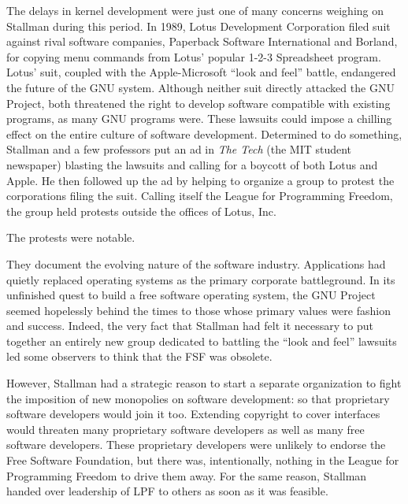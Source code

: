 The delays in kernel development were just one of many concerns weighing on Stallman during this period. In 1989, Lotus Development Corporation filed suit against rival software companies, Paperback Software International and Borland, for copying menu commands from Lotus' popular 1-2-3 Spreadsheet program. Lotus' suit, coupled with the Apple-Microsoft ``look and feel'' battle, endangered the future of the GNU system. Although neither suit directly attacked the GNU Project, both threatened the right to develop software compatible with existing programs, as many GNU programs were.  These lawsuits could impose a chilling effect on the entire culture of software development. Determined to do something, Stallman and a few professors put an ad in \textit{The Tech} (the MIT student newspaper) blasting the lawsuits and calling for a boycott of both Lotus and Apple. He then followed up the ad by helping to organize a group to protest the corporations filing the suit. Calling itself the League for Programming Freedom, the group held protests outside the offices of Lotus, Inc.

The protests were notable.

They document the evolving nature of the software industry. Applications had quietly replaced operating systems as the primary corporate battleground. In its unfinished quest to build a free software operating system, the GNU Project seemed hopelessly behind the times to those whose primary values were fashion and success. Indeed, the very fact that Stallman had felt it necessary to put together an entirely new group dedicated to battling the ``look and feel'' lawsuits led some observers to think that the FSF was obsolete.

However, Stallman had a strategic reason to start a separate organization to fight the imposition of new monopolies on software development: so that proprietary software developers would join it too.  Extending copyright to cover interfaces would threaten many proprietary software developers as well as many free software developers.  These proprietary developers were unlikely to endorse the Free Software Foundation, but there was, intentionally, nothing in the League for Programming Freedom to drive them away.  For the same reason, Stallman handed over leadership of LPF to others as soon as it was feasible.

